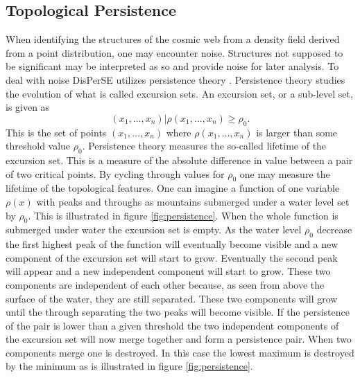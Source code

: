 \subsection{Topological Persistence}\label{sec:persistence}
When identifying the structures of the cosmic web from a density field derived
from a point distribution, one may
encounter noise. Structures not supposed to be significant may be interpreted as
so and provide noise for later analysis. To deal with noise DisPerSE utilizes
persistence theory \cite{persistence}. Persistence theory studies the evolution
of what is called excursion sets. An excursion set, or a sub-level set, is given as
\begin{equation}
    (x_1,\dots, x_n)\vert\rho(x_1,\dots, x_n)\geq\rho_0.
\end{equation}
This is the set of points $(x_1,\dots, x_n)$ where $\rho(x_1,\dots, x_n)$ is
larger than some threshold value $\rho_0$. Persistence theory measures the so-called
lifetime of the excursion set. This is a measure of the absolute
difference in value between a pair of two critical points. By cycling through
values for $\rho_0$ one may measure the lifetime of the topological features.
One can imagine a function of one variable $\rho(x)$ with peaks and throughs as
mountains submerged under a water level set by $\rho_0$. This is illustrated in
figure \ref{fig:persistence}.
When the whole function is submerged under water the excursion set is empty. As
the water level $\rho_0$ decrease the first highest peak of the function will
eventually become visible and a new component of the excursion set will start to
grow. Eventually the second peak will appear and a new independent component
will start to grow. These two components are independent of each other because,
as seen from above the surface of the water, they are still separated. These two
components will grow until the through separating the two peaks will become
visible. If the persistence of the pair is lower than a given threshold the two independent components of the excursion set will now merge
together and form a persistence pair. When two components merge one is
destroyed. In this case the lowest maximum is destroyed by the minimum as is
illustrated in figure \ref{fig:persistence}.\\

